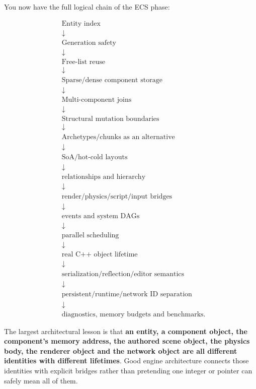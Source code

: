 You now have the full logical chain of the ECS phase:

\[
\boxed{
\begin{aligned}
&\text{Entity index}\\
&\downarrow\\
&\text{Generation safety}\\
&\downarrow\\
&\text{Free-list reuse}\\
&\downarrow\\
&\text{Sparse/dense component storage}\\
&\downarrow\\
&\text{Multi-component joins}\\
&\downarrow\\
&\text{Structural mutation boundaries}\\
&\downarrow\\
&\text{Archetypes/chunks as an alternative}\\
&\downarrow\\
&\text{SoA/hot-cold layouts}\\
&\downarrow\\
&\text{relationships and hierarchy}\\
&\downarrow\\
&\text{render/physics/script/input bridges}\\
&\downarrow\\
&\text{events and system DAGs}\\
&\downarrow\\
&\text{parallel scheduling}\\
&\downarrow\\
&\text{real C++ object lifetime}\\
&\downarrow\\
&\text{serialization/reflection/editor semantics}\\
&\downarrow\\
&\text{persistent/runtime/network ID separation}\\
&\downarrow\\
&\text{diagnostics, memory budgets and benchmarks}.
\end{aligned}
}
\]

The largest architectural lesson is that \textbf{an entity, a component object, the component's memory address, the authored scene object, the physics body, the renderer object and the network object are all different identities with different lifetimes}. Good engine architecture connects those identities with explicit bridges rather than pretending one integer or pointer can safely mean all of them.

